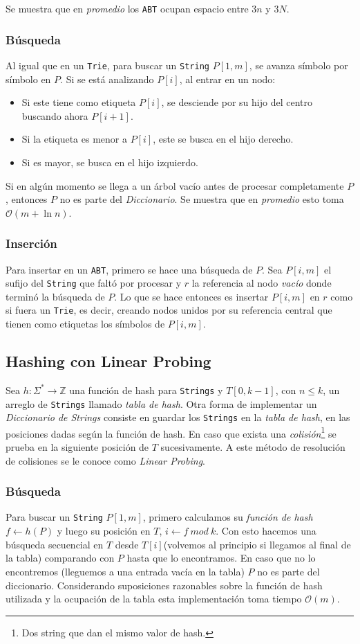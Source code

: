 \documentclass[dcc,uchile]{fcfmcourse}
\begin{document}
Se muestra que en \textit{promedio} los \texttt{ABT} ocupan espacio entre $3n$ y $3N$.
\subsubsection*{Búsqueda}
Al igual que en un \texttt{Trie}, para buscar un \texttt{String} $P[1,m]$, se avanza símbolo por símbolo en $P$. Si se está analizando $P[i]$, al entrar en un nodo:
\begin{itemize}
\item Si este tiene como etiqueta $P[i]$, se desciende por su hijo del centro buscando ahora $P[i+1]$.
\item Si la etiqueta es menor a $P[i]$, este se busca en el hijo derecho.
\item Si es mayor, se busca en el hijo izquierdo.
\end{itemize}
Si en algún momento se llega a un árbol vacío antes de procesar completamente $P$, entonces $P$ no es parte del \textit{Diccionario}. Se muestra que en \textit{promedio} esto toma $\mathcal{O}(m + \ln n)$.
\subsubsection*{Inserción}
Para insertar en un \texttt{ABT}, primero se hace una búsqueda de $P$. Sea $P[i,m]$ el sufijo del \texttt{String} que faltó por procesar y $r$ la referencia al nodo \textit{vacío} donde terminó la búsqueda de $P$. Lo que se hace entonces es insertar $P[i,m]$ en $r$ como si fuera un \texttt{Trie}, es decir, creando nodos unidos por su referencia central que tienen como etiquetas los símbolos de $P[i,m]$.\newpage
\subsection{Hashing con Linear Probing}
Sea $h: \Sigma^* \to \mathbb{Z}$ una función de hash para \texttt{Strings} y $T[0,k-1]$, con $n\le k$, un arreglo de \texttt{Strings} llamado \textit{tabla de hash}. Otra forma de implementar un \textit{Diccionario de Strings} consiste en guardar los \texttt{Strings} en la \textit{tabla de hash}, en las posiciones dadas según la función de hash. En caso que exista una \textit{colisión}\footnote{Dos string que dan el mismo valor de hash.} se prueba en la siguiente posición de $T$ sucesivamente. A este método de resolución de colisiones se le conoce como \textit{Linear Probing}.
\subsubsection*{Búsqueda}
Para buscar un \texttt{String} $P[1,m]$, primero calculamos su \textit{función de hash} $f \gets h(P)$ y luego su posición en $T$, $i \gets f\ mod\ k$. Con esto hacemos una búsqueda secuencial en $T$ desde $T[i]$(volvemos al principio si llegamos al final de la tabla) comparando con $P$ hasta que lo encontramos. En caso que no lo encontremos (lleguemos a una entrada vacía en la tabla) $P$ no es parte del diccionario. Considerando suposiciones razonables sobre la función de hash utilizada y la ocupación de la tabla esta implementación toma tiempo $\mathcal{O}(m)$.
\end{document}
